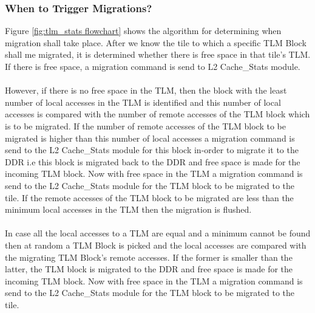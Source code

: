 \documentclass{listhesis}
\begin{document}
\subsubsection{When to Trigger Migrations?}
Figure \ref{fig:tlm_stats flowchart} shows the algorithm for determining when migration shall take place. After we know the tile to which a specific TLM Block shall me migrated, it is determined whether there is free space in that tile's TLM. If there is free space, a migration command is send to L2 Cache{\_}Stats module. \\
\\
However, if there is no free space in the TLM, then the block with the least number of local accesses in the TLM is identified and this number of local accesses is compared with the number of remote accesses of the TLM block which is to be migrated. If the number of remote accesses of the TLM block to be migrated is higher than this number of local accesses a migration command is send to the L2 Cache{\_}Stats module for this block in-order to migrate it to the DDR i.e this block is migrated back to the DDR and free space is made for the incoming TLM block. Now with free space in the TLM a migration command is send to the  L2 Cache{\_}Stats module for the TLM block to be migrated to the tile. If the remote accesses of the TLM block to be migrated are less than the minimum local accesses in the TLM then the migration is flushed.\\
\\
In case all the local accesses to a TLM are equal and a minimum cannot be found then at random a TLM Block is picked and the local accesses are compared with the migrating TLM Block's remote accesses. If the former is smaller than the latter, the TLM block is migrated to the DDR and free space is made for the incoming TLM block. Now with free space in the TLM a migration command is send to the  L2 Cache{\_}Stats module for the TLM block to be migrated to the tile. \\
\end{document}
